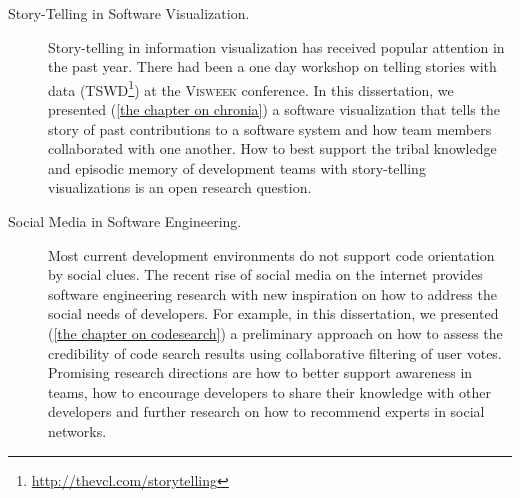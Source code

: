 \begin{description}
\item[Story-Telling in Software Visualization.] 
%
Story-telling in information visualization has received popular attention in the past year. There had been a one day workshop on telling stories with data (TSWD\footnote{\url{http://thevcl.com/storytelling}}) at the \textsc{Visweek} conference. In this dissertation, we presented (\autoref{the chapter on chronia}) a software visualization that tells the story of past contributions to a software system and how team members collaborated with one another. How to best support the tribal knowledge and episodic memory of development teams with story-telling visualizations is an open research question.

\item[Social Media in Software Engineering.] 
%
Most current development environments do not support code orientation by social clues.  
The recent rise of social media on the internet provides software engineering research with new inspiration on how to address the social needs of developers. For example, in this dissertation, we presented (\autoref{the chapter on codesearch}) a preliminary approach on how to assess the credibility of code search results using collaborative filtering of user votes. Promising research directions are how to better support awareness in teams, how to encourage developers to share their knowledge with other developers and further research on how to recommend experts in social networks.

\item[]
\end{description}

